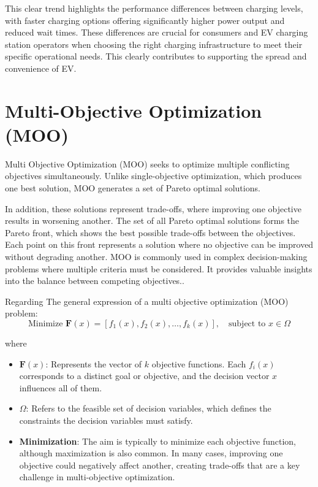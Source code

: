 This clear trend highlights the performance differences between charging levels, with faster charging options offering significantly higher power output and reduced wait times. These differences are crucial for consumers and EV charging station operators when choosing the right charging infrastructure to meet their specific operational needs. This clearly contributes to supporting the spread and convenience of EV.




\section{Multi-Objective Optimization (MOO)}
Multi Objective Optimization (MOO) seeks to optimize multiple conflicting objectives simultaneously. Unlike single-objective optimization, which produces one best solution, MOO generates a set of Pareto optimal solutions\cite{Multi-Objective Optimization using Evolutionary Algorithms}. 

In addition, these solutions represent trade-offs, where improving one objective results in worsening another. The set of all Pareto optimal solutions forms the Pareto front, which shows the best possible trade-offs between the objectives. Each point on this front represents a solution where no objective can be improved without degrading another. MOO is commonly used in complex decision-making problems where multiple criteria must be considered. It provides valuable insights into the balance between competing objectives.\cite{Multi-Objective Optimization using Evolutionary Algorithms}.

Regarding \cite{Nonlinear multiobjective optimization} The general expression of a multi objective optimization (MOO) problem:
\[
\text{Minimize } \mathbf{F}(x) = [f_1(x), f_2(x), \ldots, f_k(x)], \quad \text{subject to } x \in \Omega
\]

where 
\begin{itemize}
  \item \textbf{\( \mathbf{F}(x) \)}: Represents the vector of \( k \) objective functions. Each \( f_i(x) \) corresponds to a distinct goal or objective, and the decision vector \( x \) influences all of them.
  
  \item \textbf{\( \Omega \)}: Refers to the feasible set of decision variables, which defines the constraints the decision variables must satisfy.
  
  \item \textbf{Minimization}: The aim is typically to minimize each objective function, although maximization is also common. In many cases, improving one objective could negatively affect another, creating trade-offs that are a key challenge in multi-objective optimization.
\end{itemize}


